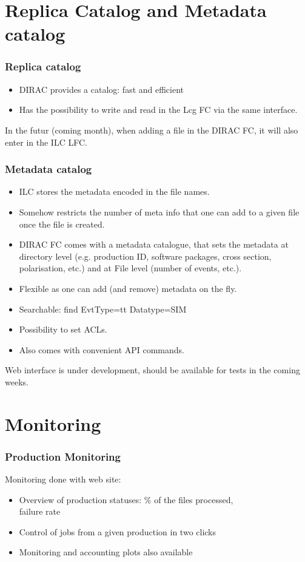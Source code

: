 \documentclass{beamer}
\begin{document}
\section{Replica Catalog and Metadata catalog}
\begin{frame}
\frametitle{Replica catalog} 
\begin{itemize}
\item \alert{DIRAC provides a catalog}: fast and efficient
\item Has the possibility to \alert{write and read in the Lcg FC via the same interface}.
\end{itemize}
In the futur (coming month), when adding a file in the DIRAC FC, it will also enter in the ILC LFC.
 \end{frame}
\begin{frame}
\frametitle{Metadata catalog}
\begin{itemize}
\item ILC stores the metadata encoded in the file names.
\item Somehow restricts the number of meta info that one can add to a given file once the file is created.
\item DIRAC FC comes with a metadata catalogue, that sets the \alert{metadata at directory level} (e.g. production ID, software packages, cross section, polarisation, etc.) and at File level (number of events, etc.).
\item Flexible as one can add (and remove) metadata on the fly.
\item Searchable: find EvtType=tt Datatype=SIM
\item Possibility to set ACLs.
\item Also comes with convenient API commands.
\end{itemize} 
Web interface is under development, should be available for tests in the coming weeks.
 \end{frame}
\section{Monitoring}
\begin{frame}
\frametitle{Production Monitoring}
Monitoring done with web site: 
\begin{itemize}
\item Overview of production statuses: \% of the files processed,\\ failure rate
\item Control of jobs from a given production in two clicks
\item Monitoring and accounting plots also available
\end{itemize}

\end{frame}
\end{document}
